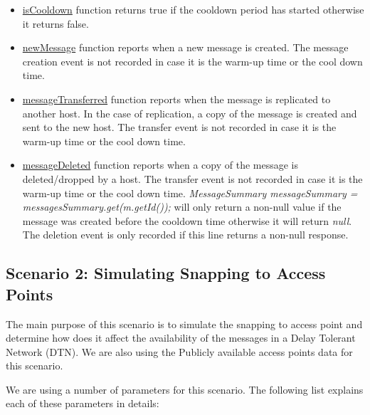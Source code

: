 \begin{itemize}
	\item \underline{isCooldown} function returns true if the cooldown period has started otherwise it returns false.
	\item \underline{newMessage} function reports when a new message is created. The message creation event is not recorded in case it is the warm-up time or the cool down time.
	\item \underline{messageTransferred} function reports when the message is replicated to another host. In the case of replication, a copy of the message is created and sent to the new host. The transfer event is not recorded in case it is the warm-up time or the cool down time.
	\item \underline{messageDeleted} function reports when a copy of the message is deleted/dropped by a host. The transfer event is not recorded in case it is the warm-up time or the cool down time. \newline \textit{MessageSummary messageSummary = messagesSummary.get(m.getId());} will only return a non-null value if the message was created before the cooldown time otherwise it will return \textit{null}. The deletion event is only recorded if this line returns a non-null response.
\end{itemize}

\newpage
\subsection{Scenario 2: Simulating Snapping to Access Points}
The main purpose of this scenario is to simulate the snapping to access point and determine how does it affect the availability of the messages in a Delay Tolerant Network (DTN). We are also using the Publicly available access points data for this scenario.

We are using a number of parameters for this scenario. The following list explains each of these parameters in details:

